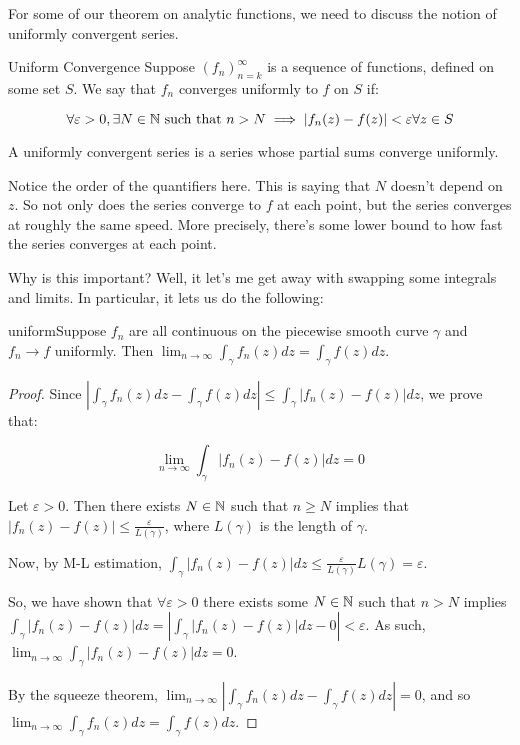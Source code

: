 For some of our theorem on analytic functions, we need to discuss the notion of uniformly convergent series.

\begin{defbo}{Uniform Convergence}{} Suppose $(f_n)_{n = k}^\infty$ is a sequence of functions, defined on some set $S$. We say that $f_n$ converges uniformly to $f$ on $S$ if:

$$\forall \varepsilon > 0, \exists N \in \mathbb{N} \text{ such that } n > N \implies |f_n(z) - f(z)| < \varepsilon \forall z\in S$$

A uniformly convergent series is a series whose partial sums converge uniformly.
\end{defbo}

Notice the order of the quantifiers here. This is saying that $N$ doesn't depend on $z$. So not only does the series converge to $f$ at each point, but the series converges at roughly the same speed. More precisely, there's some lower bound to how fast the series converges at each point.

Why is this important? Well, it let's me get away with swapping some integrals and limits. In particular, it lets us do the following:

\begin{thmbo}{}{uniform}Suppose $f_n$ are all continuous on the piecewise smooth curve $\gamma$ and $f_n \rightarrow f$ uniformly. Then $\lim_{n\rightarrow \infty} \int_{\gamma} f_n(z)dz = \int_\gamma f(z)dz$.
\end{thmbo}

\begin{proof} Since $\left|\int_{\gamma} f_n(z)dz - \int_{\gamma} f(z)dz\right| \le \int_{\gamma} |f_n(z) - f(z)|dz$, we prove that:

$$\lim_{n\rightarrow \infty} \int_{\gamma} |f_n(z) - f(z)|dz = 0$$

Let $\varepsilon > 0$. Then there exists $N \in \mathbb{N}$ such that $n\ge N$ implies that $|f_n(z) - f(z)| \le \frac{\varepsilon}{L(\gamma)}$, where $L(\gamma)$ is the length of $\gamma$.

Now, by M-L estimation, $\int_{\gamma} |f_n(z) - f(z)|dz \le \frac{\varepsilon}{L(\gamma)}L(\gamma) = \varepsilon$.

So, we have shown that $\forall\varepsilon > 0$ there exists some $N\in \mathbb{N}$ such that $n > N$ implies $\int_{\gamma} |f_n(z)- f(z)|dz = \left| \int_{\gamma} |f_n(z) - f(z)| dz - 0 \right| < \varepsilon$. As such, $\lim_{n \rightarrow \infty} \int_{\gamma} |f_n(z) - f(z)|dz = 0$.

By the squeeze theorem, $\lim_{n \rightarrow \infty} \left|\int_{\gamma} f_n(z)dz - \int_{\gamma} f(z)dz\right| = 0$, and so $\lim_{n\rightarrow \infty} \int_{\gamma} f_n(z)dz = \int_{\gamma} f(z)dz$.
\end{proof}

